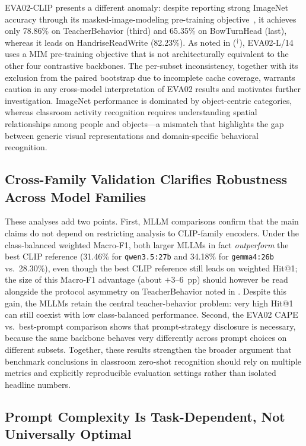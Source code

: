 \documentclass[electronics,article,submit,pdftex,moreauthors]{Definitions/mdpi}
\begin{document}
EVA02-CLIP presents a different anomaly: despite reporting strong ImageNet accuracy through its masked-image-modeling pre-training objective~\cite{sun2023eva02}, it achieves only 78.86\% on TeacherBehavior (third) and 65.35\% on BowTurnHead (last), whereas it leads on HandriseReadWrite (82.23\%). As noted in  ($^{\dagger}$), EVA02-L/14 uses a MIM pre-training objective that is not architecturally equivalent to the other four contrastive backbones. The per-subset inconsistency, together with its exclusion from the paired bootstrap due to incomplete cache coverage, warrants caution in any cross-model interpretation of EVA02 results and motivates further investigation.
ImageNet performance is dominated by object-centric categories, whereas classroom activity recognition requires understanding spatial relationships among people and objects---a mismatch that highlights the gap between generic visual representations and domain-specific behavioral recognition.

\subsection{Cross-Family Validation Clarifies Robustness Across Model Families}

These analyses add two points. First, MLLM comparisons confirm that the main claims do not depend on restricting analysis to CLIP-family encoders. Under the class-balanced weighted Macro-F1, both larger MLLMs in fact \emph{outperform} the best CLIP reference (31.46\% for \texttt{qwen3.5:27b} and 34.18\% for \texttt{gemma4:26b} vs.\ 28.30\%), even though the best CLIP reference still leads on weighted Hit@1; the size of this Macro-F1 advantage (about $+3$--$6$~pp) should however be read alongside the protocol asymmetry on TeacherBehavior noted in . Despite this gain, the MLLMs retain the central teacher-behavior problem: very high Hit@1 can still coexist with low class-balanced performance. Second, the EVA02 CAPE vs.\ best-prompt comparison shows that prompt-strategy disclosure is necessary, because the same backbone behaves very differently across prompt choices on different subsets. Together, these results strengthen the broader argument that benchmark conclusions in classroom zero-shot recognition should rely on multiple metrics and explicitly reproducible evaluation settings rather than isolated headline numbers.

\subsection{Prompt Complexity Is Task-Dependent, Not Universally Optimal}
\end{document}
